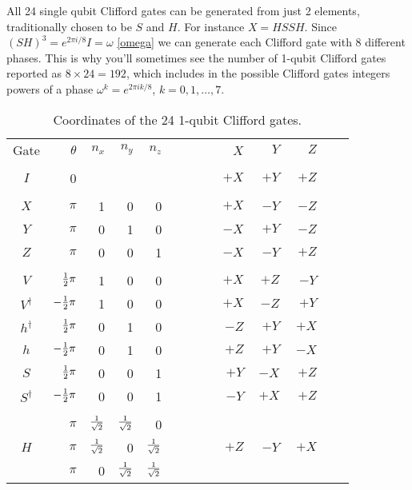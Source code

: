 All 24 single qubit Clifford gates can be generated from just 2 elements, traditionally chosen to be $S$ and $H$. For instance $X=HSSH$. Since  $(S H)^3 = e^{2\pi i/8} I=\omega$ \eqref{omega} we can generate each Clifford gate with 8 different phases. This is why you'll sometimes see the number of 1-qubit Clifford gates reported as $8\times24=192$, which includes in the possible Clifford gates integers powers of a phase $\omega^k = e^{2\pi i k/8}$, $k ={0,1,\ldots,7}$. 
\label{cliffordomega}


\begin{table}[htp]
\caption{Coordinates of the 24 1-qubit Clifford gates.}
\label{tab:Clifford1q}
\begin{center}
\begin{tabular}{crrrrrrrcc}
Gate & $\theta$ & $n_x$ & $n_y$ & $n_z$ & ~~~~~~ $\phantom{+}X$ & $\phantom{+}Y$ &  $\phantom{+}Z$
\\
\\
$I$ & 0 &&&												    		& $+X$ & $+Y$ & $+Z$
\\
\\
$X$ 					& $\pi$ 				& 1 & 0 & 0 		& $+X$ & $-Y$ & $-Z$
\\
$Y$ 			      	& $\pi$ 		 		& 0 & 1 & 0 		& $-X$ & $+Y$ & $-Z$
\\
$Z$ 					& $\pi$ 				& 0 & 0 & 1 		& $-X$ & $-Y$ & $+Z$
\\ 
\\
$V$ 					& $\sfrac{1}{2}\pi$ 	& 1 & 0 & 0  		& $+X$ & $+Z$ & $-Y$  
\\
$ V^\dagger$   			& $-\sfrac{1}{2}\pi$ 	& 1 & 0 & 0  		& $+X$ & $-Z$ & $+Y$  
\\
$h^\dagger$            	& $\sfrac{1}{2}\pi$ 	& 0 & 1 & 0  		& $-Z$ & $+Y$ & $+X$ 
\\
$h$    					& $-\sfrac{1}{2}\pi$  	& 0 & 1 & 0  		& $+Z$ & $+Y$ & $-X$ 
\\
$S$ 					& $\sfrac{1}{2}\pi$  	& 0 & 0 & 1  		& $+Y$ & $-X$ & $+Z$
\\
$S^\dagger$ 			& $-\sfrac{1}{2}\pi$ 	& 0 & 0 & 1  		& $-Y$ & $+X$ & $+Z$
\\
\\
						& $\pi$ 				& $\sfrac{1}{\sqrt{2}}$ & $\sfrac{1}{\sqrt{2}}$ & 0 	&%
\\
$H$						& $\pi$ 				& $\sfrac{1}{\sqrt{2}}$ &0 & $\sfrac{1}{\sqrt{2}}$ 		%
& $+Z$ & $-Y$ & $+X$ \\
						& $\pi$ 				& 0 & $\sfrac{1}{\sqrt{2}}$ & $\sfrac{1}{\sqrt{2}}$ 	&%

\end{tabular}
\end{center}
\end{table}
